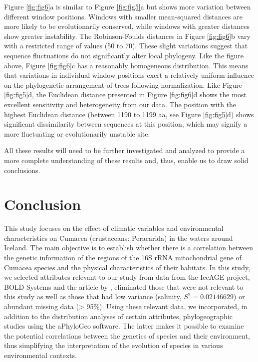 Figure \ref{fig:fig6}a is similar to Figure \ref{fig:fig5}a but shows more variation between different window positions. Windows with smaller mean-squared distances are more likely to be evolutionarily conserved, while windows with greater distances show greater instability. The Robinson-Foulds distances in Figure \ref{fig:fig6}b vary with a restricted range of values (50 to 70). These slight variations suggest that sequence fluctuations do not significantly alter local phylogeny. Like the figure above, Figure \ref{fig:fig6}c has a reasonably homogeneous distribution. This means that variations in individual window positions exert a relatively uniform influence on the phylogenetic arrangement of trees following normalization. Like Figure \ref{fig:fig5}d, the Euclidean distance presented in Figure \ref{fig:fig6}d shows the most excellent sensitivity and heterogeneity from our data. The position with the highest Euclidean distance (between 1190 to  1199 aa, see Figure \ref{fig:fig5}d) shows significant dissimilarity between sequences at this position, which may signify a more fluctuating or evolutionarily unstable site. 

All these results will need to be further investigated and analyzed to provide a more complete understanding of these results and, thus, enable us to draw solid conclusions.

\section{Conclusion}\label{conclusion}

This study focuses on the effect of climatic variables and environmental characteristics on Cumacea (crustaceans: Peracarida) in the waters around Iceland. The main objective is to establish whether there is a correlation between the genetic information of the regions of the 16S rRNA mitochondrial gene of Cumacea species and the physical characteristics of their habitats. In this study, we selected attributes relevant to our study from data from the IceAGE project, BOLD Systems and the article by \cite{uhlir_adding_2021}, eliminated those that were not relevant to this study as well as those that had low variance (salinity, $S^2 = 0.02146629$) or abundant missing data (> 95\%). Using these relevant data, we incorporated, in addition to the distribution analyses of certain attributes, phylogeographic studies using the aPhyloGeo software. The latter makes it possible to examine the potential correlations between the genetics of species and their environment, thus simplifying the interpretation of the evolution of species in various environmental contexts.

